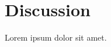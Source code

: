 \documentclass[12pt]{article}
\begin{document}
\section{Discussion}
Lorem ipsum dolor sit amet.\parencite{aljunid_economic_2014}



\clearpage
\newrefcontext[sorting=nyt]
\printbibliography
\end{document}
